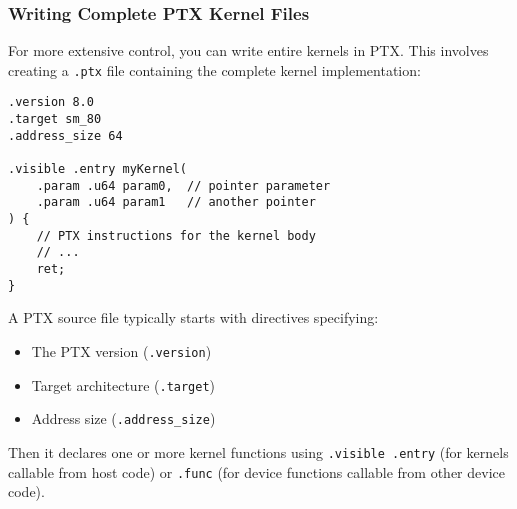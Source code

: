 \subsubsection{Writing Complete PTX Kernel Files}

For more extensive control, you can write entire kernels in PTX. This involves creating a \texttt{.ptx} file containing the complete kernel implementation:

\begin{lstlisting}[style=ptx]
.version 8.0
.target sm_80
.address_size 64

.visible .entry myKernel(
    .param .u64 param0,  // pointer parameter
    .param .u64 param1   // another pointer
) {
    // PTX instructions for the kernel body
    // ...
    ret;
}
\end{lstlisting}

A PTX source file typically starts with directives specifying:
\begin{itemize}
    \item The PTX version (\texttt{.version})
    \item Target architecture (\texttt{.target})
    \item Address size (\texttt{.address\_size})
\end{itemize}

Then it declares one or more kernel functions using \texttt{.visible .entry} (for kernels callable from host code) or \texttt{.func} (for device functions callable from other device code).

